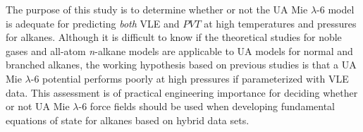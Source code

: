 \documentclass[journal=jctc,manuscript=article]{achemso}
\begin{document}

The purpose of this study is to determine whether or not the UA Mie $\lambda$-6 model is adequate for predicting \textit{both} VLE and $PVT$ at high temperatures and pressures for alkanes. Although it is difficult to know if the theoretical studies for noble gases and all-atom \textit{n}-alkane models are applicable to UA models for normal and branched alkanes, the working hypothesis based on previous studies is that a UA Mie $\lambda$-6 potential performs poorly at high pressures if parameterized with VLE data. 
This assessment is of practical engineering importance for deciding whether or not UA Mie $\lambda$-6 force fields should be used when developing fundamental equations of state for alkanes based on hybrid data sets.




%
%




\end{document}
